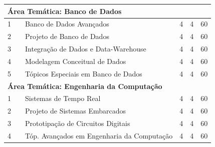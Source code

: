 \documentclass[
	12pt,				%
	openright,			%
  oneside,     %
	a4paper,			%
	chapter=TITLE,		%
	english,			%
	french,				%
	spanish,			%
	brazil				%
	]{abntex2}
\begin{document}
\begin{apendicesenv}
\begin{longtable}{r|r|l|r|r|r}
\multicolumn{6}{l}{\textbf{Área Temática: Banco de Dados} } \\ \hline
    1     &       & Banco de Dados Avançados & 4     & 4     & 60 \\ \hline
    2     &       & Projeto de Banco de Dados & 4     & 4     & 60 \\ \hline
    3     &       & Integração de Dados e Data-Warehouse & 4     & 4     & 60 \\ \hline
    4     &       & Modelagem Conceitual de Dados & 4     & 4     & 60 \\ \hline
    5     &       & Tópicos Especiais em Banco de Dados & 4     & 4     & 60 \\ \hline

\multicolumn{6}{l}{\textbf{Área Temática: Engenharia da Computação}}\\ \hline
    1     &       & Sistemas de Tempo Real & 4     & 4     & 60 \\ \hline
    2     &       & Projeto de Sistemas Embarcados & 4     & 4     & 60 \\ \hline
    3     &       & Prototipação de Circuitos Digitais & 4     & 4     & 60 \\ \hline
    4     &       & \small{Tóp. Avançados em Engenharia da Computação} & 4     & 4     & 60 \\ \hline


\end{longtable}
\end{apendicesenv}
\end{document}
